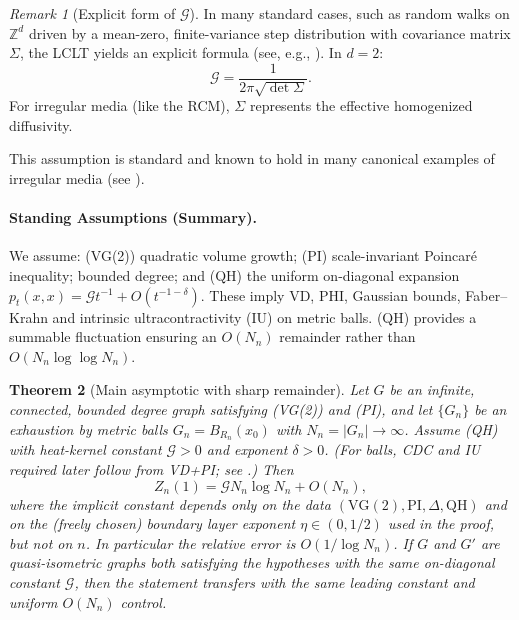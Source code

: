 \documentclass{article}
\numberwithin{equation}{section}
\newtheorem{theorem}{Theorem}[section]
\theoremstyle{definition}
\theoremstyle{remark}
\newtheorem{remark}[theorem]{Remark}
\newcommand{\cG}{\mathcal{G}}
\begin{document}
\begin{remark}[Explicit form of $\cG$]\label{rem:G_formula}
In many standard cases, such as random walks on $\mathbb{Z}^d$ driven by a mean-zero, finite-variance step distribution with covariance matrix $\Sigma$, the LCLT yields an explicit formula (see, e.g., \cite[Ch. 2]{LawlerLimic10}). In $d=2$:
\[
\cG = \frac{1}{2\pi\sqrt{\det\Sigma}}.
\]
For irregular media (like the RCM), $\Sigma$ represents the effective homogenized diffusivity.
\end{remark}

This assumption is standard and known to hold in many canonical examples of irregular media (see ).
\paragraph{Standing Assumptions (Summary).} We assume: (VG(2)) quadratic volume growth; (PI) scale-invariant Poincaré inequality; bounded degree; and (QH) the uniform on-diagonal expansion $p_t(x,x)=\cG t^{-1}+O(t^{-1-\delta})$. These imply VD, PHI, Gaussian bounds, Faber--Krahn and intrinsic ultracontractivity (IU) on metric balls. (QH) provides a summable fluctuation ensuring an $O(N_n)$ remainder rather than $O(N_n\log\log N_n)$.

\begin{theorem}[Main asymptotic with sharp remainder]\label{thm:main}
Let $G$ be an infinite, connected, bounded degree graph satisfying (VG(2)) and (PI), and let $\{G_n\}$ be an exhaustion by metric balls $G_n=B_{R_n}(x_0)$ with $N_n=|G_n|\to\infty$. Assume (QH) with heat-kernel constant $\cG>0$ and exponent $\delta>0$. (For balls, CDC and IU required later follow from VD+PI; see .) Then
\[
  Z_n(1)= \cG N_n \log N_n + O(N_n),
\]
where the implicit constant depends only on the data $(\mathrm{VG(2)},\mathrm{PI},\Delta,\mathrm{QH})$ and on the (freely chosen) boundary layer exponent $\eta\in(0,1/2)$ used in the proof, but not on $n$. In particular the relative error is $O(1/\log N_n)$. If $G$ and $G'$ are quasi-isometric graphs both satisfying the hypotheses with the \emph{same} on-diagonal constant $\cG$, then the statement transfers with the same leading constant and uniform $O(N_n)$ control.
\end{theorem}
\end{document}
